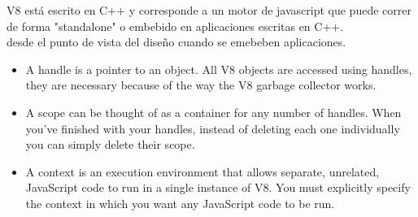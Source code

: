 




V8 está escrito en C++ y corresponde a un motor de javascript que puede correr de forma "standalone" o embebido 
en aplicaciones escritas en C++.\\


desde el punto de vista del diseño cuando se emebeben aplicaciones.
    
\begin{itemize}
 \item A handle is a pointer to an object. All V8 objects are accessed using handles, they are necessary because
   of the way the V8 garbage collector works.
 \item A scope can be thought of as a container for any number of handles. When you've finished with your handles,
   instead of deleting each one individually you can simply delete their scope.
 \item A context is an execution environment that allows separate, unrelated, JavaScript code to run in a single
   instance of V8. You must explicitly specify the context in which you want any JavaScript code to be run.
\end{itemize}




